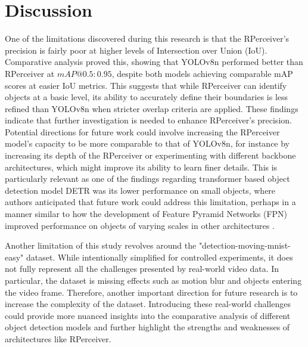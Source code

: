 \section{Discussion} \label{Discussion}

One of the limitations discovered during this research is that the RPerceiver's precision is fairly poor at higher levels of Intersection over Union (IoU). Comparative analysis proved this, showing that YOLOv8n performed better than RPerceiver at $mAP@0.5:0.95$, despite both models achieving comparable mAP scores at easier IoU metrics. This suggests that while RPerceiver can identify objects at a basic level, its ability to accurately define their boundaries is less refined than YOLOv8n when stricter overlap criteria are applied. These findings indicate that further investigation is needed to enhance RPerceiver's precision. Potential directions for future work could involve increasing the RPerceiver model's capacity to be more comparable to that of YOLOv8n, for instance by increasing its depth of the RPerceiver or experimenting with different backbone architectures, which might improve its ability to learn finer details. This is particularly relevant as one of the findings regarding transformer based object detection model DETR \cite{carionEndtoEndObjectDetection2020} was its lower performance on small objects, where authors anticipated that future work could address this limitation, perhaps in a manner similar to how the development of Feature Pyramid Networks (FPN) \cite{linFeaturePyramidNetworks2017} improved performance on objects of varying scales in other architectures \cite{carionEndtoEndObjectDetection2020}.

Another limitation of this study revolves around the "detection-moving-mnist-easy" dataset. While intentionally simplified for controlled experiments, it does not fully represent all the challenges presented by real-world video data. In particular, the dataset is missing effects such as motion blur and objects entering the video frame. Therefore, another important direction for future research is to increase the complexity of the dataset. Introducing these real-world challenges could provide more nuanced insights into the comparative analysis of different object detection models and further highlight the strengths and weaknesses of architectures like RPerceiver.

